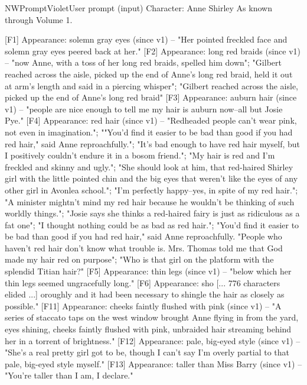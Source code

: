 \begin{nwprompt}{NWPromptViolet}{User prompt (input)}
Character: Anne Shirley
As known through Volume 1.

[F1] Appearance: solemn gray eyes (since v1) -- "Her pointed freckled face and solemn gray eyes peered back at her."
[F2] Appearance: long red braids (since v1) -- "now Anne, with a toss of her long red braids, spelled him down"; "Gilbert reached across the aisle, picked up the end of Anne's long red braid, held it out at arm's length and said in a piercing whisper"; "Gilbert reached across the aisle, picked up the end of Anne's long red braid"
[F3] Appearance: auburn hair (since v1) -- "people are nice enough to tell me my hair is auburn now--all but Josie Pye."
[F4] Appearance: red hair (since v1) -- "Redheaded people can't wear pink, not even in imagination."; ""You'd find it easier to be bad than good if you had red hair," said Anne reproachfully."; "It's bad enough to have red hair myself, but I positively couldn't endure it in a bosom friend."; "My hair is red and I'm freckled and skinny and ugly."; "She should look at him, that red-haired Shirley girl with the little pointed chin and the big eyes that weren't like the eyes of any other girl in Avonlea school."; "I'm perfectly happy--yes, in spite of my red hair."; "A minister mightn't mind my red hair because he wouldn't be thinking of such worldly things."; "Josie says she thinks a red-haired fairy is just as ridiculous as a fat one"; "I thought nothing could be as bad as red hair."; "You'd find it easier to be bad than good if you had red hair," said Anne reproachfully. "People who haven't red hair don't know what trouble is. Mrs. Thomas told me that God made my hair red on purpose"; "Who is that girl on the platform with the splendid Titian hair?"
[F5] Appearance: thin legs (since v1) -- "below which her thin legs seemed ungracefully long."
[F6] Appearance: sho
[... 776 characters elided ...]
oroughly and it had been necessary to shingle the hair as closely as possible."
[F11] Appearance: cheeks faintly flushed with pink (since v1) -- "A series of staccato taps on the west window brought Anne flying in from the yard, eyes shining, cheeks faintly flushed with pink, unbraided hair streaming behind her in a torrent of brightness."
[F12] Appearance: pale, big-eyed style (since v1) -- "She's a real pretty girl got to be, though I can't say I'm overly partial to that pale, big-eyed style myself."
[F13] Appearance: taller than Miss Barry (since v1) -- "You're taller than I am, I declare."
\end{nwprompt}

